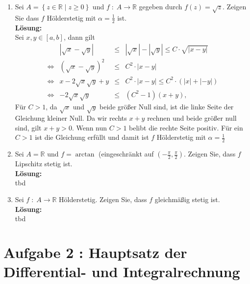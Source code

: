 \documentclass[11pt,a4paper,ngerman]{article}
\begin{document}
\begin{enumerate}[\bfseries a)]
    \item Sei $A=\left\{ z \in \mathbb{R} \; | \; z \geq 0 \right\}$ und $f \; : \; A \rightarrow \mathbb {R}$ gegeben durch $f(z) = \sqrt{z}$. Zeigen Sie dass $f$ Hölderstetig mit $\alpha = \frac{1}{2}$ ist.\\

\textbf{Lösung:}\\

Sei $x,y \in [a,b]$, dann gilt
$$
\begin{array}{lrcl}
&| \sqrt{x} - \sqrt{y} | & \leq & | \sqrt{x} | - | \sqrt{y} | \leq C \cdot \sqrt{| x - y |}\\
\Leftrightarrow & \left( \sqrt{x} - \sqrt{y} \right)^2 & \leq & C^2 \cdot |x - y|\\
\Leftrightarrow & x - 2\sqrt{x}\sqrt{y} + y &\leq& C^2 \cdot | x - y | \leq C^2 \cdot \left( |x| + |-y| \right)\\
\Leftrightarrow & - 2 \sqrt{x}\sqrt{y} &\leq& (C^2-1) (x + y),
\end{array}
$$
Für $C>1$, da $\sqrt{x}$ und $\sqrt{y}$ beide größer Null sind, ist die linke Seite der Gleichung kleiner Null. Da wir rechts $x+y$ rechnen und beide größer null sind, gilt $x+y > 0$. Wenn nun $C>1$ belibt die rechte Seite positiv. Für ein $C>1$ ist die Gleichung erfüllt und damit ist $f$ Hölderstetig mit $\alpha = \frac{1}{2}$

    \item Sei $A=\mathbb{R}$ und $f=\arctan$ (eingeschränkt auf $\left( -\frac{\pi}{2},\frac{\pi}{2} \right)$. Zeigen Sie, dass $f$ Lipschitz stetig ist.\\

\textbf{Lösung:}\\

tbd

    \item Sei $f \; : \; A \rightarrow \mathbb{R}$ Hölderstetig. Zeigen Sie, dass $f$ gleichmäßig stetig ist.\\

\textbf{Lösung:}\\

tbd

\end{enumerate}


\section*{Aufgabe 2 : \mdseries Hauptsatz der Differential- und Integralrechnung}
\end{document}
